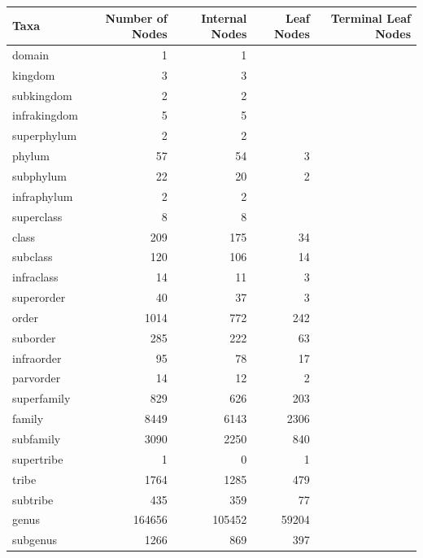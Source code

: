     \begin{table}[h!]
      \begin{center}
        \begin{tabular}{ |l|r||r|r|r| }
          \hline
          Taxa & Number of Nodes & Internal Nodes & Leaf Nodes & Terminal Leaf Nodes \\
          \hline \hline
          \setrow{\bfseries}domain & 1 & 1 & &  \\ \hline
          \setrow{\bfseries}kingdom & 3 & 3 & &  \\
          subkingdom & 2 & 2 & & \\
          infrakingdom & 5 & 5 & & \\
          superphylum & 2 & 2 & & \\ \hline
          \setrow{\bfseries}phylum & 57 & 54 & 3 & \\
          subphylum & 22 & 20 & 2 & \\
          infraphylum & 2 & 2 & & \\
          superclass & 8 & 8 & & \\ \hline
          \setrow{\bfseries}class & 209 & 175 & 34 & \\
          subclass & 120 & 106 & 14 & \\
          infraclass & 14 & 11 & 3 & \\
          superorder & 40 & 37 & 3 & \\ \hline
          \setrow{\bfseries}order & 1014 & 772 & 242 & \\
          suborder & 285 & 222 & 63 & \\
          infraorder & 95 & 78 & 17 & \\
          parvorder & 14 & 12 & 2 & \\
          superfamily & 829 & 626 & 203 & \\ \hline
          \setrow{\bfseries}family & 8449 & 6143 & 2306 & \\
          subfamily & 3090 & 2250 & 840 & \\
          supertribe & 1 & 0 & 1 & \\
          tribe & 1764 & 1285 & 479 & \\
          subtribe & 435 & 359 & 77 & \\ \hline
          \setrow{\bfseries}genus & 164656 & 105452 & 59204 & \\
          subgenus & 1266 & 869 & 397 & \\

\end{tabular}
\end{center}
\end{table}
